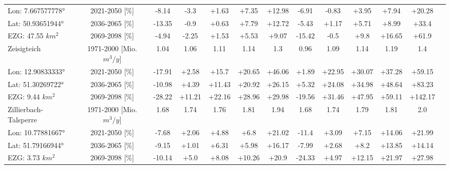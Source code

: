 \begin{longtable}{@{\extracolsep{\fill}}lc|ccccc||cccccc}
\cline{2-12} 
Lon: 7.667577778° & 2021-2050 [\%]  & -8.14 & -3.3 & +1.63 & +7.35 & +12.98 & -6.91 & -0.83 & +3.95 & +7.94 & +20.28\\ 
Lat: 50.93651944° & 2036-2065 [\%]  & -13.35 & -0.9 & +0.63 & +7.79 & +12.72 & -5.43 & +1.17 & +5.71 & +8.99 & +33.4\\ 
EZG: 47.55 $km^2$ & 2069-2098 [\%]  & -4.94 & -2.25 & +1.53 & +5.53 & +9.07 & -15.42 & -0.5 & +9.8 & +16.65 & +61.9\\ 
\hline 
Zeisigteich & 1971-2000 [Mio. $m^3/y$]  & 1.04 & 1.06 & 1.11 & 1.14 & 1.3 & 0.96 & 1.09 & 1.14 & 1.19 & 1.4\\ 
\cline{2-12} 
Lon: 12.90833333° & 2021-2050 [\%]  & -17.91 & +2.58 & +15.7 & +20.65 & +46.06 & +1.89 & +22.95 & +30.07 & +37.28 & +59.15\\ 
Lat: 51.30269722° & 2036-2065 [\%]  & -10.98 & +4.39 & +11.43 & +20.92 & +26.15 & +5.32 & +24.08 & +34.98 & +48.64 & +83.23\\ 
EZG: 9.44 $km^2$ & 2069-2098 [\%]  & -28.22 & +11.21 & +22.16 & +28.96 & +29.98 & -19.56 & +31.46 & +47.95 & +59.11 & +142.17\\ 
\hline 
Zillierbach-Talsperre & 1971-2000 [Mio. $m^3/y$]  & 1.68 & 1.74 & 1.76 & 1.81 & 1.94 & 1.68 & 1.74 & 1.79 & 1.81 & 2.0\\ 
\cline{2-12} 
Lon: 10.77881667° & 2021-2050 [\%]  & -7.68 & +2.06 & +4.88 & +6.8 & +21.02 & -11.4 & +3.09 & +7.15 & +14.06 & +21.99\\ 
Lat: 51.79166944° & 2036-2065 [\%]  & -9.15 & +1.01 & +6.31 & +5.98 & +16.17 & -7.99 & +2.68 & +8.2 & +13.85 & +14.14\\ 
EZG: 3.73 $km^2$ & 2069-2098 [\%]  & -10.14 & +5.0 & +8.08 & +10.26 & +20.9 & -24.33 & +4.97 & +12.15 & +21.97 & +27.98\\\hline
\end{longtable}
\addtolength{\tabcolsep}{5.9pt}\label{Qrouted_sum_Talsperren_less50facc}
